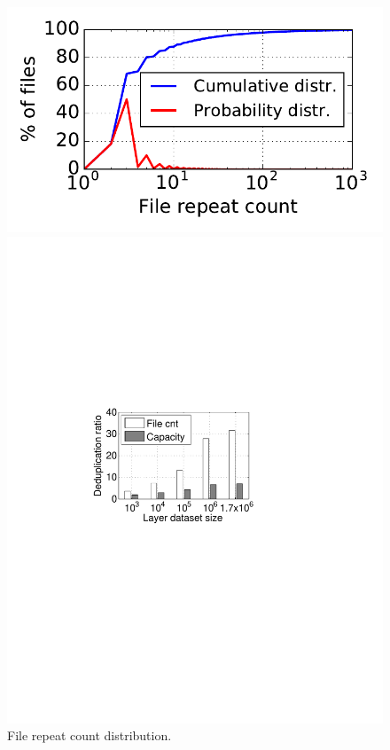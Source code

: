 
\begin{figure}[t]
	\centering
	\begin{minipage}{0.35\textwidth}
		\centering
		\includegraphics[width=1\textwidth]{graphs/File_repeat_count-eps.pdf}
		\caption{File repeat count distribution.
		}
		\label{fig:file-repeat-cnt}
	\end{minipage}
	\begin{minipage}{0.35\textwidth}
		\centering
		\includegraphics[width=1\textwidth]{graphs/dedup-ratio-grow} 

\end{minipage}
\end{figure}
